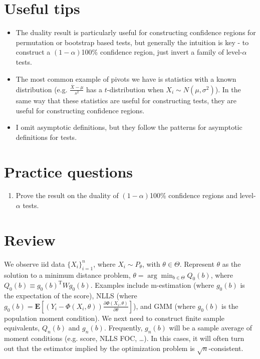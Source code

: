 \documentclass[12pt,english]{article}
\newcommand{\T}{\ensuremath{\text{T}}}
\begin{document}
\section{Useful tips}

\begin{itemize}
	\item The duality result is particularly useful for constructing confidence regions for permutation or bootstrap based tests, but generally the intuition is key - to construct a $(1 - \alpha)$100\% confidence region, just invert a family of level-$\alpha$ tests.
	\item The most common example of pivots we have is statistics with a known distribution (e.g. $\frac{\overline{X} - \mu}{s^{2}}$ has a $t$-distribution when $X_{i} \sim N(\mu, \sigma^{2})$). In the same way that these statistics are useful for constructing tests, they are useful for constructing confidence regions.
	\item I omit asymptotic definitions, but they follow the patterns for asymptotic definitions for tests.
\end{itemize}

\section{Practice questions}

\begin{enumerate}
	\item Prove the result on the duality of $(1 - \alpha)$100\% confidence regions and level-$\alpha$ tests.
\end{enumerate}

\section{Review}

We observe iid data $\{ X_{i} \}_{i=1}^{n}$, where $X_{i} \sim P_{\theta}$, with $\theta \in \Theta$. Represent $\theta$ as the solution to a minimum distance problem, $\theta = \arg \min_{b \in \Theta} Q_{0}(b)$, where $Q_{0}(b) \equiv g_{0}(b)^{\T} W g_{0}(b)$. Examples include m-estimation (where $g_{0}(b)$ is the expectation of the score), NLLS (where $g_{0}(b) = \mathbf{E}[(Y_{i} - \Phi(X_{i}, \theta)) \frac{\partial \Phi(X_{i}, \theta)}{\partial \theta} ]$), and GMM (where $g_{0}(b)$ is the population moment condition). We next need to construct finite sample equivalents, $Q_{n}(b)$ and $g_{n}(b)$. Frequently, $g_{n}(b)$ will be a sample average of moment conditions (e.g. score, NLLS FOC, \ldots). In this cases, it will often turn out that the estimator implied by the optimization problem is $\sqrt{n}$-consistent.
\end{document}
